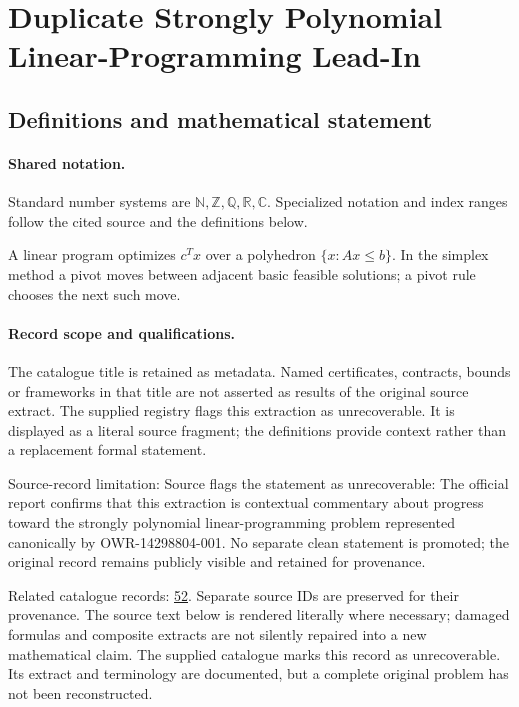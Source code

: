 \documentclass[11pt]{article}
\begin{document}
\section{Duplicate Strongly Polynomial Linear-Programming Lead-In}\label{statement}

\subsection{Definitions and mathematical statement}

\paragraph{Shared notation.}Standard number systems are $\mathbb N,\mathbb Z,\mathbb Q,\mathbb R,\mathbb C$. Specialized notation and index ranges follow the cited source and the definitions below.


A linear program optimizes $c^Tx$ over a polyhedron $\{x:Ax\leq b\}$. In the simplex method a pivot moves between adjacent basic feasible solutions; a pivot rule chooses the next such move.
\paragraph{Record scope and qualifications.}
The catalogue title is retained as metadata. Named certificates, contracts, bounds or frameworks in that title are not asserted as results of the original source extract.
The supplied registry flags this extraction as unrecoverable. It is displayed as a literal source fragment; the definitions provide context rather than a replacement formal statement.

Source-record limitation: Source flags the statement as unrecoverable: The official report confirms that this extraction is contextual commentary about progress toward the strongly polynomial linear-programming problem represented canonically by OWR-14298804-001. No separate clean statement is promoted; the original record remains publicly visible and retained for provenance.

Related catalogue records: \href{https://mehmetmars7.github.io/Erdosproblems-llm-hunter/problem.html?type=open_problems&id=52}{52}. Separate source IDs are preserved for their provenance.
The source text below is rendered literally where necessary; damaged formulas and composite extracts are not silently repaired into a new mathematical claim.
The supplied catalogue marks this record as unrecoverable. Its extract and terminology are documented, but a complete original problem has not been reconstructed.
\end{document}
